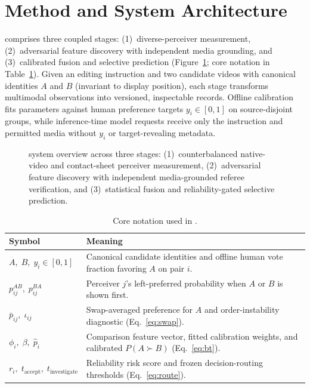 \section{Method and System Architecture}
\label{sec:method}

\critical comprises three coupled stages: (1)~diverse-perceiver measurement, (2)~adversarial feature discovery with independent media grounding, and (3)~calibrated fusion and selective prediction (Figure~\ref{fig:flowchart}; core notation in Table~\ref{tab:notation}). Given an editing instruction and two candidate videos with canonical identities $A$ and $B$ (invariant to display position), each stage transforms multimodal observations into versioned, inspectable records. Offline calibration fits parameters against human preference targets $y_i\in[0,1]$ on source-disjoint groups, while inference-time model requests receive only the instruction and permitted media without $y_i$ or target-revealing metadata.

\begin{figure}[t]
\centering

\caption{\critical system overview across three stages: (1)~counterbalanced native-video and contact-sheet perceiver measurement, (2)~adversarial feature discovery with independent media-grounded referee verification, and (3)~statistical fusion and reliability-gated selective prediction.}
\label{fig:flowchart}
\end{figure}

\begin{table}[t]
\centering
\caption{Core notation used in \critical.}
\label{tab:notation}
\footnotesize
\begin{tabular}{@{}lp{5.5cm}@{}}
\toprule
Symbol & Meaning \\
\midrule
$A,\; B,\; y_i\in[0,1]$ & Canonical candidate identities and offline human vote fraction favoring $A$ on pair $i$. \\
$p^{AB}_{ij},\; p^{BA}_{ij}$ & Perceiver $j$'s left-preferred probability when $A$ or $B$ is shown first. \\
$\bar p_{ij},\; \iota_{ij}$ & Swap-averaged preference for $A$ and order-instability diagnostic (Eq.~\ref{eq:swap}). \\
$\phi_i,\; \beta,\; \hat p_i$ & Comparison feature vector, fitted calibration weights, and calibrated $P(A\succ B)$ (Eq.~\ref{eq:bt}). \\
$r_i,\; t_{\mathrm{accept}},\; t_{\mathrm{investigate}}$ & Reliability risk score and frozen decision-routing thresholds (Eq.~\ref{eq:route}). \\
\bottomrule
\end{tabular}
\end{table}

